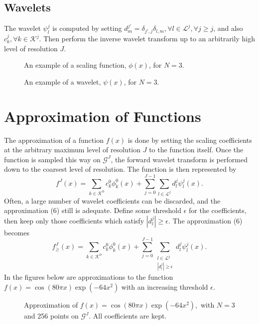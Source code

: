 \documentclass[11pt]{article}
\begin{document}
\subsection{Wavelets}
The wavelet $\psi_{l}^{j}$ is computed by setting $d_{m}^{j'} = \delta_{j',j} \delta_{l,m}, \forall l \in \mathcal{L}^{j}, \forall j \geq j$, and also $c_{k}^{j}, \forall k \in \mathcal{K}^j$. Then perform the inverse wavelet transform up to an arbitrarily high level of resolution $J$.

\begin{figure}
	\center
	
	\caption{An example of a scaling function, $\phi(x)$, for $N=3$.}
\end{figure}
\begin{figure}
	\center
	
	\caption{An example of a wavelet, $\psi(x)$, for $N=3$.}
\end{figure}
\section{Approximation of Functions}
The approximation of a function $f(x)$ is done by setting the scaling coefficients at the arbitrary maximum level of resolution $J$ to the function itself. Once the function is sampled this way on $\mathcal{G}^J$, the forward wavelet transform is 
performed down to the coarsest level of resolution. The function is then represented by 
\begin{equation}
        f^J(x)=\sum_{k \in \mathcal{K}^0} c_{k}^{0} \phi_{k}^{0}(x) + \sum_{j=0}^{J-1} \sum_{l \in \mathcal{L}^j}
                d_{l}^{j} \psi_{l}^{j}(x).
\end{equation}
Often, a large number of wavelet coefficients can be discarded, and the approximation (6) still is adequate. Define some threshold $\epsilon$ for the coefficients, then keep only those coefficients which satisfy $|d_{l}^{j}| \geq \epsilon$. The approximation (6) becomes 
\begin{equation}
        f_{\geq}^{J}(x)=\sum_{k \in \mathcal{K}^0} c_{k}^{0} \phi_{k}^{0}(x) + \sum_{j=0}^{J-1} \sum_{ \substack{ l \in \mathcal{L}^j \\ |d_{l}^{j}| \geq \epsilon} } d_{l}^{j} \psi_{l}^{j}(x).
\end{equation}
In the figures below are approximations to the function $f(x)=\cos{(80 \pi x)} \exp{(-64 x^2)}$ with an increasing threshold 
$\epsilon$.
\begin{figure}[H]
	\center
	
	\caption{Approximation of $f(x)=\cos{(80 \pi x)} \exp{(-64 x^2)},$ with $N=3$ and 256 points on $\mathcal{G}^J$. All coefficients are kept.}
\end{figure}
\end{document}
